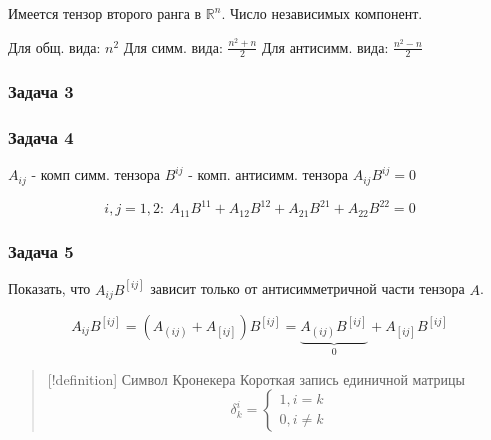 Имеется тензор второго ранга в \(\mathbb{R}^{n}\). Число независимых
компонент.

Для общ. вида: \(n^{2}\) Для симм. вида: \(\frac{n^{2}+n}{2}\) Для
антисимм. вида: \(\frac{n^{2}-n}{2}\)

\subsubsection{Задача 3}


\subsubsection{Задача 4}

\(A_{ij}\) - комп симм. тензора \(B^{ij}\) - комп. антисимм. тензора
\(A_{ij}B^{ij} = 0\)

$$i,j = 1,2: \ A_{11}B^{11} + A_{12}B^{12} + A_{21}B^{21} + A_{22}B^{22} = 0$$

\subsubsection{Задача 5}

Показать, что \(A_{ij}B^{[ij]}\) зависит только от антисимметричной
части тензора \(A\).

$$A_{ij}B^{[ij]} = (A_{(ij)} + A_{[ij]})B^{[ij]} = \underbrace{A_{(ij)}B^{[ij]}}_{0} + A_{[ij]}B^{[ij]}$$

\begin{quote}
{[}!definition{]} Символ Кронекера Короткая запись единичной матрицы
$$\delta_{k}^{i} = \begin{cases}
1, i=k \\
0, i\neq k
\end{cases}$$
\end{quote}

